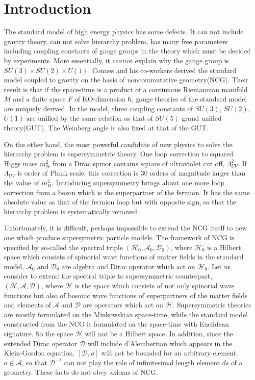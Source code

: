 \documentclass{ptephy}%
\begin{document}
\section{Introduction}
The standard model of high energy physics has some defects. It can not include gravity theory, can not 
solve hierarchy problem, has many free parameters including coupling constants of gauge groups in the 
theory which must be decided by experiments. More essentially, it cannot explain why the gauge group 
is $SU(3) \times SU(2) \times U(1)$.    
 Connes and his co-workers derived the standard model coupled to gravity on the basis of noncommutative  geometry(NCG)\cite{rf:Grcoupled,connes1,rf:JHigh,rf:NCGneutrino}. Their result is that if 
the space-time is a product of a 
continuous Riemannian manifold $M$ and a finite space $F$ of KO-dimension 6, gauge theories of the 
standard model are uniquely derived\cite{connes3,conceptual}. 
In the model, three coupling constants of $SU(3)$, $SU(2)$, $U(1)$ are unified by the same relation 
as that of $SU(5)$ grand unified theory(GUT). The Weinberg angle is also fixed at that of the GUT. 

On the other hand, the most powerful candidate of new physics to solve the hierarchy problem 
is supersymmetric theory\cite{susy}. One loop correction to squared Higgs mass $m_H^2$ from a 
Dirac spinor contains square of ultraviolet cut off, $\Lambda_{UV}^2$. If $\Lambda_{UV}$ is 
order of Plank scale, this correction is 30 orders of magnitude larger than the value of $m_H^2$. 
Introducing supersymmetry brings about one more loop correction from a boson which is the superpartner of the 
fermion. It has the same absolute value as that of the fermion loop but with opposite sign, so that the hierarchy problem 
is systematically removed.  

Unfortunately, it is difficult, perhaps impossible to extend the NCG itself to new one which produce 
supersymetric particle models. The framework of NCG is specified by so-called the spectral triple 
$(\mathcal{H}_0 ,\mathcal{A}_0,\mathcal{D}_0)$, where $\mathcal{H}_0$ is a Hilbert space which consists of 
spinorial wave functions of matter fields in the standard model, $\mathcal{A}_0$ and $\mathcal{D}_0$ are 
algebra and Dirac operator which act on $\mathcal{H}_0$. Let us consider to extend the spectral triple 
to supersymmetric counterpart, $(\mathcal{H},\mathcal{A},\mathcal{D})$, where $\mathcal{H}$
is the space which consists of not only spinorial wave functions but also of bosonic wave functions
of superpartners of the matter fields and elements of $\mathcal{A}$ and $\mathcal{D}$ are 
operators which act on $\mathcal{H}$. 
Supersymmetric theories are mostly formulated on the Minkowskian space-time, while the standard model constructed 
from the NCG is formulated on the space-time with Euclidean signature. So the space $\mathcal{H}$ will not be a
Hilbert space. In addition, since the extended Dirac operator $\mathcal{D}$ will include d'Alembertian 
which appears in the Klein-Gordon equation, $[\mathcal{D},a]$ will not be bounded for an arbitrary element $a\in \mathcal{A}$, 
so that $\mathcal{D}^{-1} $ can not play the role of infinitesimal length element $ds$ of a geometry. 
These facts do not obey axioms of NCG.  
\end{document}
